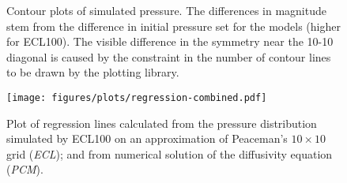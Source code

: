 \begin{figure}
    \begin{minipage}[b]{.5\linewidth}
        \centering\scalebox{.52}{}
        \label{fig:contour-ecl10}
    \end{minipage}%
    \begin{minipage}[b]{.5\linewidth}
        \centering\scalebox{.52}{}
        \label{fig:contour-mrst10}
    \end{minipage}
    \caption{Contour plots of simulated pressure. The differences in magnitude stem from the difference in initial pressure set for the models (higher for ECL100). The visible difference in the symmetry near the 10-10 diagonal is caused by the constraint in the number of contour lines to be drawn by the plotting library.}
    \label{fig:contours-ect10-mrst10}
\end{figure}


\begin{figure}[htbp]
    \centering
    \texttt{[image: figures/plots/regression-combined.pdf]}
    \caption{Plot of regression lines calculated from the pressure distribution simulated by ECL100 on an approximation of Peaceman's $10\times 10$ grid (\emph{ECL}); and from numerical solution of the diffusivity equation (\emph{PCM}).}
    \label{fig:regression-combined}
\end{figure}



